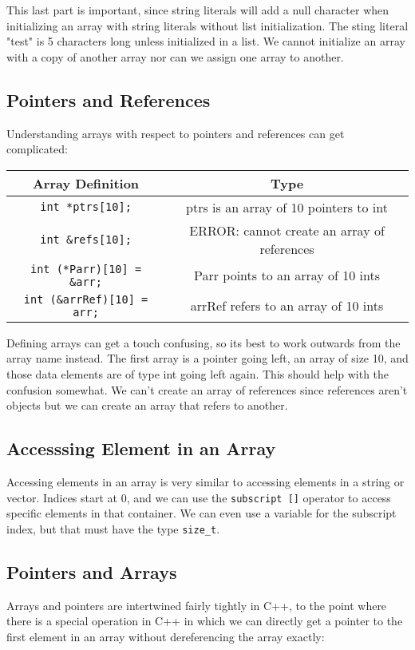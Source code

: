 \documentclass[12pt, a4paper]{report}
\begin{document}
This last part is important, since string literals will add a null character when initializing an array with string literals without list initialization.
The sting literal "test" is 5 characters long unless initialized in a list.
We cannot initialize an array with a copy of another array nor can we assign one array to another.
\subsection{Pointers and References}
Understanding arrays with respect to pointers and references can get complicated:
\begin{center}
	\begin{tabular}{ |c|c| }
		\hline
		Array Definition & Type \\
		\hline
		\verb|int *ptrs[10];| & ptrs is an array of 10 pointers to int \\
		\hline
		\verb|int &refs[10];| & ERROR: cannot create an array of references \\
		\hline
		\verb|int (*Parr)[10] = &arr;| & Parr points to an array of 10 ints \\
		\hline
		\verb|int (&arrRef)[10] = arr;| & arrRef refers to an array of 10 ints \\
		\hline
	\end{tabular}
\end{center}
Defining arrays can get a touch confusing, so its best to work outwards from the array name instead.
The first array is a pointer going left, an array of size 10, and those data elements are of type int going left again.
This should help with the confusion somewhat.
We can't create an array of references since references aren't objects but we can create an array that refers to another.
\subsection{Accesssing Element in an Array}
Accessing elements in an array is very similar to accessing elements in a string or vector.
Indices start at 0, and we can use the \verb|subscript []| operator to access specific elements in that container.
We can even use a variable for the subscript index, but that must have the type \verb|size_t|.
\subsection{Pointers and Arrays}
Arrays and pointers are intertwined fairly tightly in C++, to the point where there is a special operation in C++ in which we can directly get a pointer to the first element in an array without dereferencing the array exactly:
\end{document}
